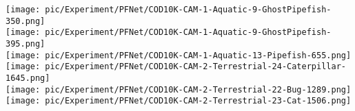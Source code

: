 \documentclass{ecai}
\begin{document}
\begin{figure*}[t]
{\begin{minipage}[t]{0.1\textwidth}
			\vspace{0.01\linewidth}
                \texttt{[image: pic/Experiment/PFNet/COD10K-CAM-1-Aquatic-9-GhostPipefish-350.png]}\\
			\vspace{0.01\linewidth}
                \texttt{[image: pic/Experiment/PFNet/COD10K-CAM-1-Aquatic-9-GhostPipefish-395.png]}\\
			\vspace{0.01\linewidth}
			\texttt{[image: pic/Experiment/PFNet/COD10K-CAM-1-Aquatic-13-Pipefish-655.png]}\\
			\vspace{0.01\linewidth}
			\texttt{[image: pic/Experiment/PFNet/COD10K-CAM-2-Terrestrial-24-Caterpillar-1645.png]}\\
			\vspace{0.01\linewidth}
                \texttt{[image: pic/Experiment/PFNet/COD10K-CAM-2-Terrestrial-22-Bug-1289.png]}\\
                \vspace{0.01\linewidth}
			\texttt{[image: pic/Experiment/PFNet/COD10K-CAM-2-Terrestrial-23-Cat-1506.png]}\\
			\vspace{0.08\linewidth}
		\end{minipage}%
	}\hspace{0.018\columnwidth}
\end{figure*}
\end{document}
